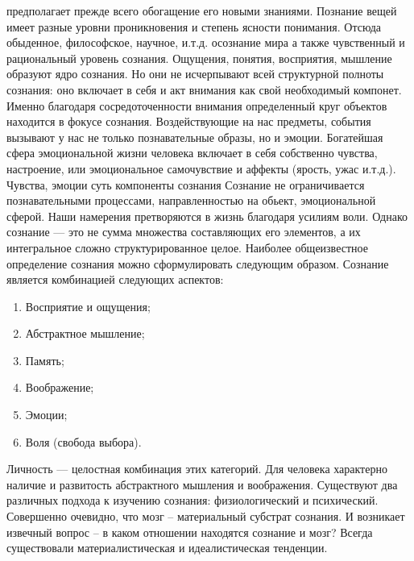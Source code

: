 \documentclass[12pt]{article}
\begin{document}
предполагает  прежде  всего  обогащение  его  новыми  знаниями.  Познание  вещей  имеет  разные  уровни
проникновения и степень ясности понимания. Отсюда обыденное, философское, научное, и.т.д. осознание мира
а также чувственный и рациональный уровень сознания. Ощущения, понятия, восприятия, мышление образуют
ядро  сознания.  Но  они  не  исчерпывают  всей  структурной  полноты  сознания:  оно  включает  в  себя  и  акт
внимания как свой необходимый компонет. Именно благодаря сосредоточенности внимания определенный круг
объектов находится в фокусе сознания. Воздействующие на нас предметы, события вызывают у нас не только
познавательные  образы,  но  и  эмоции.  Богатейшая  сфера  эмоциональной  жизни  человека  включает  в  себя
собственно чувства, настроение, или эмоциональное самочувствие и аффекты (ярость, ужас и.т.д.). Чувства,
эмоции  суть  компоненты  сознания  Сознание  не  ограничивается  познавательными  процессами,
направленностью на обьект, эмоциональной сферой. Наши намерения претворяются в жизнь благодаря усилиям
воли. Однако сознание — это не сумма множества составляющих его элементов, а их интегральное сложно
структурированное целое.
Наиболее  общеизвестное  определение  сознания  можно  сформулировать  следующим  образом.  Сознание
является комбинацией следующих аспектов:
\begin{enumerate}
  \item Восприятие и ощущения;
\item Абстрактное мышление;
\item Память;
\item Воображение;
\item Эмоции;
\item Воля (свобода выбора).
\end{enumerate}
Личность --- целостная комбинация этих категорий. Для человека характерно наличие и развитость абстрактного
мышления  и  воображения.  Существуют  два  различных  подхода  к  изучению  сознания:  физиологический  и
психический. 
Совершенно очевидно, что мозг – материальный субстрат сознания. И возникает извечный вопрос – в каком
отношении  находятся  сознание  и  мозг?  Всегда  существовали  материалистическая  и  идеалистическая
тенденции.
\end{document}

